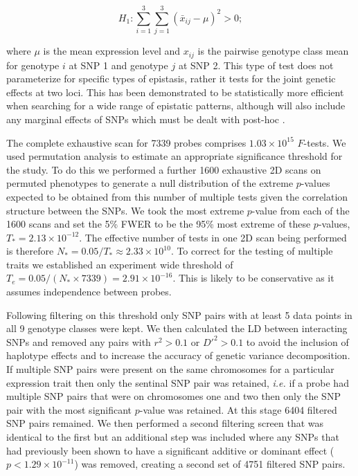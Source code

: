 \documentclass{article}
\begin{document}
\begin{equation}
H _1 : \sum _{i=1} ^3 \sum _{j=1} ^3 (\bar x _{ij} - \mu) ^2 > 0; 
\label{eq:8df}
\end{equation}

where $\mu$ is the mean expression level and $x _{ij}$ is the pairwise genotype class mean for genotype $i$ at SNP 1 and genotype $j$ at SNP 2. This type of test does not parameterize for specific types of epistasis, rather it tests for the joint genetic effects at two loci. This has been demonstrated to be statistically more efficient when searching for a wide range of epistatic patterns, although will also include any marginal effects of SNPs which must be dealt with post-hoc \cite{Hemani2013}.
 
The complete exhaustive scan for 7339 probes comprises $1.03 \times 10^{15}$ $F$-tests. We used permutation analysis to estimate an appropriate significance threshold for the study. To do this we performed a further 1600 exhaustive 2D scans on permuted phenotypes to generate a null distribution of the extreme $p$-values expected to be obtained from this number of multiple tests given the correlation structure between the SNPs. We took the most extreme $p$-value from each of the 1600 scans and set the 5\% FWER to be the 95\% most extreme of these $p$-values, $T_{*} = 2.13 \times 10^{-12}$. The effective number of tests in one 2D scan being performed is therefore $N_{*} = 0.05 / T_{*} \approx 2.33 \times 10^{10}$. To correct for the testing of multiple traits we established an experiment wide threshold of $T_{e} = 0.05 / (N_{*} \times 7339) = 2.91 \times 10^{-16}$. This is likely to be conservative as it assumes independence between probes.

Following filtering on this threshold only SNP pairs with at least 5 data points in all 9 genotype classes were kept. We then calculated the LD between interacting SNPs and removed any pairs with $r^2 > 0.1$ or $D'^{2} > 0.1$ to avoid the inclusion of haplotype effects and to increase the accuracy of genetic variance decomposition. If multiple SNP pairs were present on the same chromosomes for a particular expression trait then only the sentinal SNP pair was retained, \emph{i.e.} if a probe had multiple SNP pairs that were on chromosomes one and two then only the SNP pair with the most significant $p$-value was retained. At this stage 6404 filtered SNP pairs remained. We then performed a second filtering screen that was identical to the first but an additional step was included where any SNPs that had previously been shown to have a significant additive or dominant effect ($p < 1.29 \times 10^{-11}$) was removed, creating a second set of 4751 filtered SNP pairs.
\end{document}
